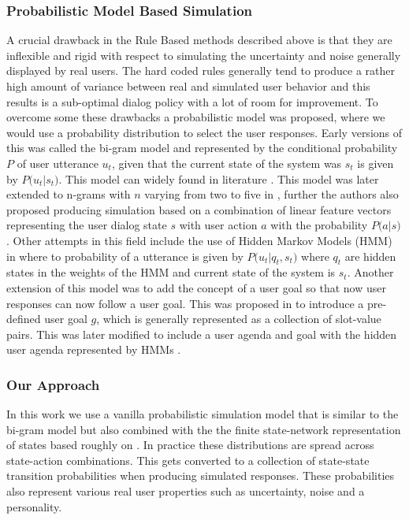 \documentclass[14pt]{extarticle}
\numberwithin{equation}{section}
\begin{document}
	\subsubsection{Probabilistic Model Based Simulation}	
	A crucial drawback in the Rule Based methods described above is that they are inflexible and rigid with respect to simulating the uncertainty and noise generally displayed by real users. The hard coded rules generally tend to produce a rather high amount of variance between real and simulated user behavior and this results is a sub-optimal dialog policy with a lot of room for improvement. To overcome some these drawbacks a probabilistic model was proposed, where we would use a probability distribution to select the user responses. Early versions of this was called the bi-gram model and represented by the conditional probability $P$ of user utterance $u_t$, given that the current state of the system was $s_t$ is given by $P\big(u_t|s_t\big)$. This model can widely found in literature \cite{Cuayhuitl2006LearningMD}\cite{levin_mdp}\cite{4430164}. This model was later extended to n-grams with $n$ varying from two to five in \cite{Georgila2006UserSF}, further the authors also proposed producing simulation based on a combination of linear feature vectors representing the user dialog state $s$ with user action $a$ with the probability $P\big(a|s\big)$. Other attempts in this field include the use of Hidden Markov Models (HMM) in \cite{Cuayhuitl2005HumancomputerDS} where to probability of a utterance is given by $P\big(u_t|q_t,s_t\big)$ where $q_t$ are hidden states in the weights of the HMM and current state of the system is $s_t$. Another extension of this model was to add the concept of a user goal so that now user responses can now follow a user goal. This was proposed in \cite{Scheffler_sim} to introduce a pre-defined user goal $g$, which is generally represented as a collection of slot-value pairs. This was later modified to include a user agenda and goal with the hidden user agenda represented by HMMs \cite{Schatzmann2007StatisticalUS}.
	\subsubsection{Our Approach}
	In this work we use a vanilla probabilistic simulation model that is similar to the bi-gram model but also combined with the the finite state-network representation of states based roughly on \cite{Scheffler_sim}. In practice these distributions are spread across state-action combinations. This gets converted to a collection of state-state transition probabilities when producing simulated responses. These probabilities also represent various real user properties such as uncertainty, noise and a personality.
\end{document}
